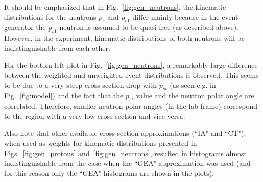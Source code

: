 It should be emphasized that in Fig.~\ref{fig:gen_neutrons}, the kinematic distributions for the neutrons $p_{s}$ and $p_{s1}$ differ mainly because in the event generator the $p_{s1}$ neutron is assumed to be quasi-free (as described above). However, in the experiment, kinematic distributions of both neutrons will be indistinguishable from each other.

For the bottom left plot in Fig.~\ref{fig:gen_neutrons}, a remarkably large difference between the weighted and unweighted event distributions is observed. This seems to be due to a very steep cross section drop with $p_{st}$ (as seen e.g. in Fig.~\ref{fig:model}) and the fact that the $p_{st}$ value and the neutron polar angle are correlated. Therefore, smaller neutron polar angles (in the lab frame) correspond to the region with a very low cross section and vice versa.




Also note that other available cross section approximations (``IA" and ``CT"), when used as weights for kinematic distributions presented in Figs.~\ref{fig:gen_protons} and~\ref{fig:gen_neutrons}, resulted in histograms almost indistinguishable from the case when the ``GEA" approximation was used (and for this reason only the ``GEA" histograms are shown in the plots).  



